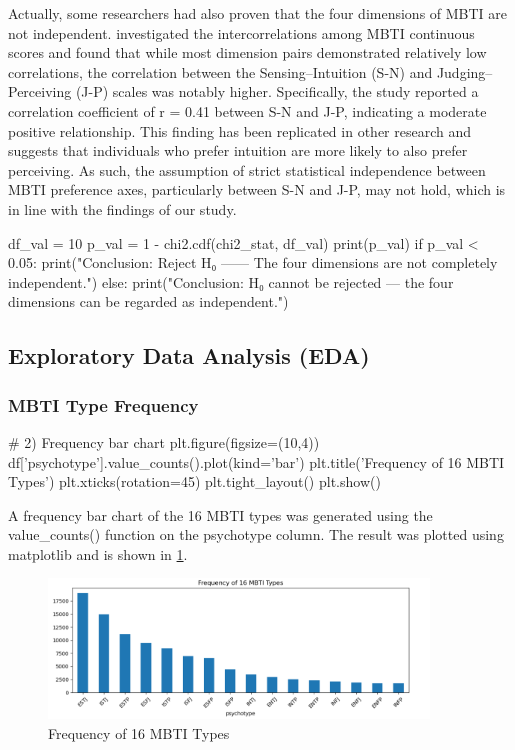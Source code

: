 \documentclass[12pt]{article}
\numberwithin{figure}{section}  %
\begin{document}
	Actually, some researchers had also proven that the four
	dimensions of MBTI are not independent. 
	investigated the intercorrelations among MBTI continuous scores and found
	that while most dimension pairs demonstrated relatively low correlations,
	the correlation between the Sensing–Intuition (S-N) and Judging–Perceiving
	(J-P) scales was notably higher. Specifically, the study reported a
	correlation coefficient of r = 0.41 between S-N and J-P, indicating a moderate
	positive relationship. This finding has been replicated in other research
	and suggests that individuals who prefer intuition are more likely to also
	prefer perceiving. As such, the assumption of strict statistical
	independence between MBTI preference axes, particularly between S-N and J-P,
	may not hold, which is in line with the findings of our study.
	\begin{python}
df_val = 10
p_val = 1 - chi2.cdf(chi2_stat, df_val)
print(p_val)
if p_val < 0.05:
    print("Conclusion: Reject H₀ —— The four dimensions are not completely independent.")
else:
    print("Conclusion: H₀ cannot be rejected — the four dimensions can be regarded as independent.")

	\end{python}

\subsection{Exploratory Data Analysis (EDA)}
\subsubsection{MBTI Type Frequency}
	\begin{python}
# 2) Frequency bar chart
plt.figure(figsize=(10,4))
df['psychotype'].value_counts().plot(kind='bar')
plt.title('Frequency of 16 MBTI Types')
plt.xticks(rotation=45)
plt.tight_layout()
plt.show()
	\end{python}
	
	A frequency bar chart of the 16 MBTI types was generated using the
	value\_counts() function on the psychotype column. The result was plotted
	using matplotlib and is shown in \cref{mbtidist}.
	\begin{figure}[H]
		\centering
		\includegraphics[width=0.9\textwidth]{Q1EDA2} 
		\caption{Frequency of 16 MBTI Types}	
		\label{mbtidist}	
	\end{figure}
	
\end{document}
